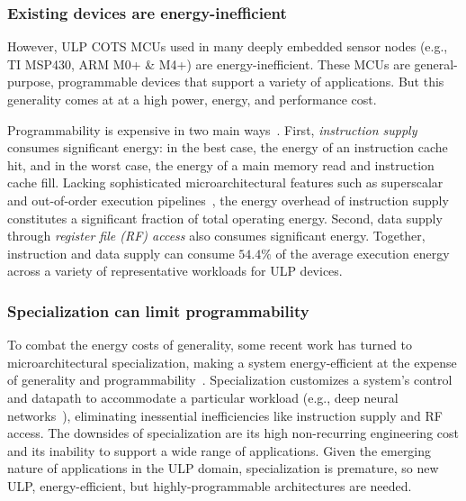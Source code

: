\subsubsection{Existing devices are energy-inefficient}
However, ULP COTS MCUs used in many deeply embedded sensor nodes
(e.g., TI MSP430, ARM M0+ \& M4+) are energy-inefficient.
%
These MCUs are general-purpose, programmable devices that support a variety of
applications.
% 
But this generality comes at at a high power, energy, and performance cost.

Programmability is expensive in two main ways~\cite{horowitz:isscc14:energy-keynote,hameed2010understanding,balfour_elm_thesis}.
First, \emph{instruction supply} consumes significant energy: in the best case, the energy of
an instruction cache hit, and in the worst case, the energy of a main memory
read and instruction cache fill.  
%
Lacking sophisticated microarchitectural features such as superscalar and
out-of-order execution pipelines~\cite{msp430fr5994,traber2016pulpino}, the energy overhead of
instruction supply constitutes a significant fraction of total operating energy.
%
Second, data supply through \emph{register file (RF) access} also consumes significant energy.
%
Together, instruction and data supply can consume
$54.4\%$ of the average execution energy across a variety of representative workloads for ULP devices.

\subsubsection{Specialization can limit programmability}
To combat the energy costs of generality, some recent work has turned to
microarchitectural specialization, making a system energy-efficient at the
expense of generality and
programmability~\cite{chen:isca16:eyeriss,chen:asplos14:diannao,du:isca15:shidiannao,liu:isca15:pudiannao,chen2014dadiannao,venkatesh2010conservation}.
% 
Specialization customizes a system's control and datapath to accommodate a
particular workload (e.g., deep neural networks~\cite{chen:isca16:eyeriss,chen:asplos14:diannao}),
eliminating inessential inefficiencies like instruction supply and RF access.
% 
The downsides of specialization are its high non-recurring engineering cost and its inability to support a wide range of applications.
% 
Given the emerging nature of applications in the ULP domain, specialization is premature, so new ULP, energy-efficient, but highly-programmable architectures are needed.

